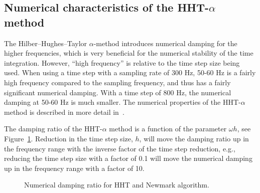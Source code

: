 %
%

%
%

\subsection{Numerical characteristics of the HHT-$\alpha$ method}

The Hilber--Hughes--Taylor $\alpha$-method introduces numerical damping for the
higher frequencies, which is very beneficial for the numerical stability of the
time integration.
However, ``high frequency'' is relative to the time step size being used.
When using a time step with a sampling rate of 300 Hz, 50-60 Hz is a fairly high
frequency compared to the sampling frequency, and thus has a fairly significant
numerical damping.
With a time step of 800 Hz, the numerical damping at 50-60 Hz is much smaller.
The numerical properties of the HHT-$\alpha$ method is described in more detail
in~\cite{GeradinRixen}.

The damping ratio of the HHT-$\alpha$ method is a function of the parameter
$\omega h$, see Figure~\ref{fig:HHTdamping}.
Reduction in the time step size, $h$, will move the damping ratio up in the
frequency range with the inverse factor of the time step reduction, e.g.,
reducing the time step size with a factor of 0.1 will move the numerical
damping up in the frequency range with a factor of 10.

\begin{figure}[p]
\caption{Numerical damping ratio for HHT and Newmark algorithm.}
\label{fig:HHTdamping}
\end{figure}

